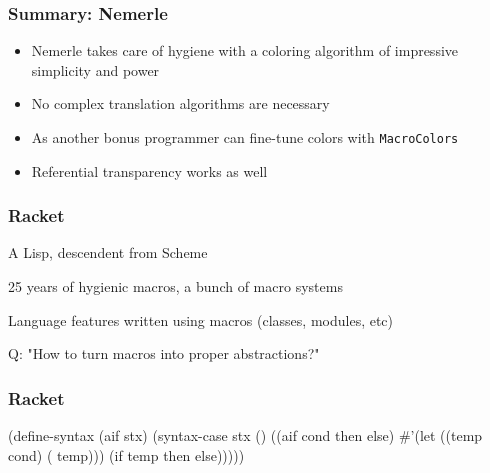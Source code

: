 \documentclass[hyperref={bookmarks=false}]{beamer}
\begin{document}
\begin{frame}[fragile]
\frametitle{Summary: Nemerle}
\begin{itemize}
\item Nemerle takes care of hygiene with a coloring algorithm of impressive simplicity and power
\item No complex translation algorithms are necessary
\item As another bonus programmer can fine-tune colors with \texttt{MacroColors}
\item Referential transparency works as well
\end{itemize}
\end{frame}

\begin{frame}[fragile]
\frametitle{Racket}
A Lisp, descendent from Scheme

25 years of hygienic macros, a bunch of macro systems

Language features written using macros (classes, modules, etc)

Q: "How to turn macros into proper abstractions?"
\end{frame}

\begin{frame}[fragile]
\frametitle{Racket}
\begin{semiverbatim}

(define-syntax (aif stx)
  (syntax-case stx ()
    ((aif cond then else)
       #'(let ((temp cond)
               ( temp)))
           (if temp then else)))))

\end{semiverbatim}
\end{frame}
\end{document}
